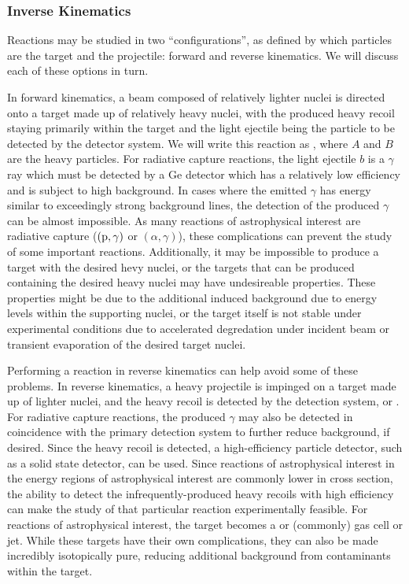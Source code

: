 \subsubsection{Inverse Kinematics}
Reactions may be studied in two ``configurations'', as defined by which
particles are the target and the projectile: forward and reverse
kinematics. We will discuss each of these options in turn.

In forward kinematics, a beam composed of relatively lighter nuclei
is directed onto a target made up of relatively heavy nuclei, with the produced
heavy recoil staying primarily within the target and the light ejectile being
the particle to be detected by the detector system. We will write this reaction
as , where $A$ and $B$ are the heavy particles. For radiative
capture reactions, the light ejectile $b$ is a $\gamma$ ray which must be
detected by a Ge detector which has a relatively low efficiency and is subject
to high background. In cases where the emitted $\gamma$ has energy similar to
exceedingly strong background lines, the detection of the produced $\gamma$ can
be almost impossible. As many reactions of astrophysical interest are radiative
capture ($(\rm{p},\gamma)$ or $(\alpha,\gamma)$), these complications can
prevent the study of some important reactions. Additionally, it may be
impossible to produce a target with the desired hevy nuclei, or the targets
that can be produced containing the desired heavy nuclei may have undesireable
properties. These properties might be due to the additional induced background
due to energy levels within the supporting nuclei, or the target itself is not
stable under experimental conditions due to accelerated degredation under
incident beam or transient evaporation of the desired target nuclei.

Performing a reaction in reverse kinematics can help avoid some of these
problems. In reverse kinematics, a heavy projectile is impinged on a target
made up of lighter nuclei, and the heavy recoil is detected by the detection
system, or . For radiative capture reactions, the produced
$\gamma$ may also be detected in coincidence with the primary detection system
to further reduce background, if desired. Since the heavy recoil is detected, a
high-efficiency particle detector, such as a solid state detector, can be used.
Since reactions of astrophysical interest in the energy regions of
astrophysical interest are commonly lower in cross section, the ability to
detect the infrequently-produced heavy recoils with high efficiency can make
the study of that particular reaction experimentally feasible. For reactions of
astrophysical interest, the target becomes a  or 
(commonly) gas cell or jet. While these targets have their own complications,
they can also be made incredibly isotopically pure, reducing additional
background from contaminants within the target.

